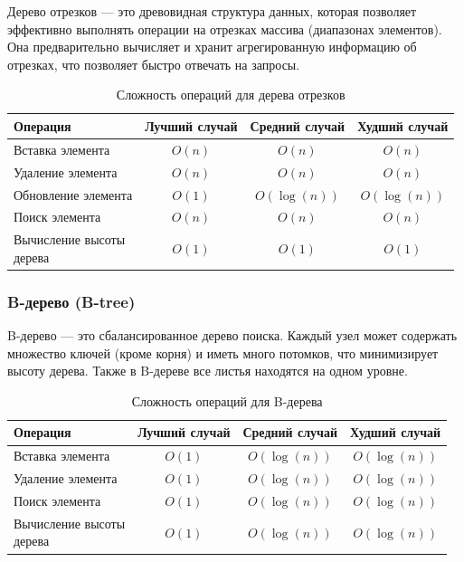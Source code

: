 \documentclass[a4paper,12pt]{article}
\begin{document}
Дерево отрезков --- это древовидная структура данных, которая позволяет эффективно выполнять операции на отрезках массива (диапазонах элементов). Она предварительно вычисляет и хранит агрегированную информацию об отрезках, что позволяет быстро отвечать на запросы.

\begin{table}[H]
    \centering
    \begin{tabular}{|l|c|c|c|}
        \hline
        Операция & Лучший случай & Средний случай & Худший случай \\
        \hline
        Вставка элемента & $O(n)$ & $O(n)$ & $O(n)$ \\
        \hline
        Удаление элемента & $O(n)$ & $O(n)$ & $O(n)$ \\
        \hline
        Обновление элемента & $O(1)$ & $O(\log(n))$ & $O(\log(n))$ \\
        \hline
        Поиск элемента & $O(n)$ & $O(n)$ & $O(n)$ \\
        \hline
        \makecell[l]{Вычисление высоты \\дерева} & $O(1)$ & $O(1)$ & $O(1)$ \\
        \hline
    \end{tabular}
    \caption{Сложность операций для дерева отрезков}
\end{table}

\subsubsection{B-дерево (B-tree)}
\label{subsubsec:b-дерево-b-tree}

B-дерево --- это сбалансированное дерево поиска. Каждый узел может содержать множество ключей (кроме корня) и иметь много потомков, что минимизирует высоту дерева. Также в B-дереве все листья находятся на одном уровне.

\begin{table}[H]
    \centering
    \begin{tabular}{|l|c|c|c|}
        \hline
        Операция & Лучший случай & Средний случай & Худший случай \\
        \hline
        Вставка элемента & $O(1)$ & $O(\log(n))$ & $O(\log(n))$ \\
        \hline
        Удаление элемента & $O(1)$ & $O(\log(n))$ & $O(\log(n))$ \\
        \hline
        Поиск элемента & $O(1)$ & $O(\log(n))$ & $O(\log(n))$ \\
        \hline
        \makecell[l]{Вычисление высоты \\дерева} & $O(1)$ & $O(\log(n))$ & $O(\log(n))$ \\
        \hline
    \end{tabular}
    \caption{Сложность операций для B-дерева}
\end{table}
\end{document}
